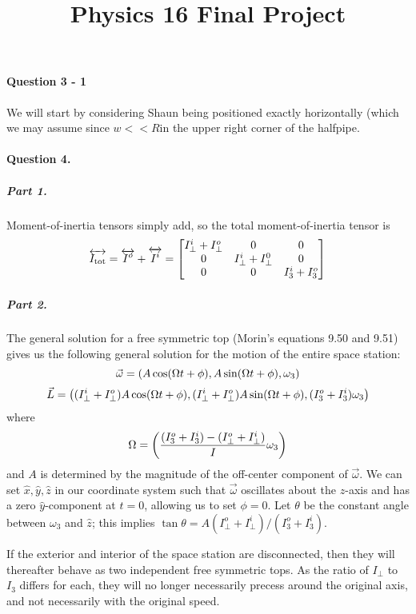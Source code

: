 \title{Physics 16 Final Project}



\paragraph{Question 3 - 1}
We will start by considering Shaun being positioned exactly horizontally (which we may assume since $w << R$in the upper right corner of the halfpipe.

\paragraph{Question 4.}

\subparagraph{Part 1.}  Moment-of-inertia tensors simply add, so the
total moment-of-inertia tensor is $$\overleftrightarrow{I_{\text{tot}}}
= \overleftrightarrow{I^o} + \overleftrightarrow{I^i} =
\begin{bmatrix}
I_\bot^i + I_\bot^o & 0 & 0 \\
0 & I_\bot^i + I_\bot^0 & 0 \\
0 & 0 & I_3^i + I_3^o
\end{bmatrix}$$


\subparagraph{Part 2.}  The general solution for a free symmetric top
(Morin's equations 9.50 and 9.51) gives us the following general solution for
the motion of the entire space station: $$\vec{\omega}
= \left(A \cos (\Omega t + \phi), A \sin (\Omega t
+ \phi), \omega_3 \right)$$ $$\vec{L} = \left((I_\bot^i + I_\bot^o) A \cos
(\Omega t + \phi), (I_\bot^i + I_\bot^o) A \sin (\Omega t + \phi),
(I_3^o + I_3^i) \omega_3 \right)$$ where $$\Omega = \left(\frac{(I_3^o + I_3^i) -
(I_\bot^o + I_\bot^i)}{I} \omega_3 \right)$$ and $A$ is determined by the
magnitude of the off-center component of $\vec{\omega}$.  We can set
$\hat{x}, \hat{y}, \hat{z}$ in our coordinate system such that
$\vec{\omega}$ oscillates about the $z$-axis and has a zero
$\hat{y}$-component at $t=0$, allowing us to set $\phi = 0$.  Let $\theta$
be the constant angle between $\omega_3$ and $\hat{z}$; this implies
$\tan \theta = A (I_\bot^o + I_\bot^i)/(I_3^o + I_3^i)$.

If the exterior and interior of the space station are disconnected,
then they will thereafter behave as two independent free symmetric
tops.  As the ratio of $I_\bot$ to $I_3$ differs for each, they will
no longer necessarily precess around the original axis, and not
necessarily with the original speed.


